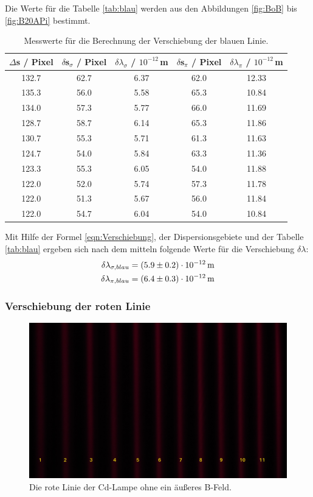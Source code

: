 Die Werte für die Tabelle \eqref{tab:blau} werden aus den Abbildungen \eqref{fig:BoB} bis \eqref{fig:B20APi} bestimmt.

\begin{table}[H]
  \centering
  \caption{Messwerte für die Berechnung der Verschiebung der blauen Linie.}
  \label{tab:blau}
  \begin{tabular}{c | c c | c c}
    $\Delta$s / Pixel & $\delta$s$_{\sigma}$ / Pixel & $\delta \lambda_{\sigma}$ / $10^{-12}$\,m & $\delta$s$_{\pi}$ / Pixel & $\delta \lambda_{\pi}$ / $10^{-12}$\,m \\
    \hline
    132.7 & 62.7 & 6.37 & 62.0 & 12.33 \\
    135.3 & 56.0 & 5.58 & 65.3 & 10.84 \\
    134.0 & 57.3 & 5.77 & 66.0 & 11.69 \\
    128.7 & 58.7 & 6.14 & 65.3 & 11.86 \\
    130.7 & 55.3 & 5.71 & 61.3 & 11.63 \\
    124.7 & 54.0 & 5.84 & 63.3 & 11.36 \\
    123.3 & 55.3 & 6.05 & 54.0 & 11.88 \\
    122.0 & 52.0 & 5.74 & 57.3 & 11.78 \\
    122.0 & 51.3 & 5.67 & 56.0 & 11.84 \\
    122.0 & 54.7 & 6.04 & 54.0 & 10.84 \\
    \hline
  \end{tabular}
\end{table}


Mit Hilfe der Formel \eqref{eqn:Verschiebung}, der Dispersionsgebiete und der Tabelle \eqref{tab:blau} ergeben sich nach dem mitteln folgende Werte für die Verschiebung $\delta\lambda$:
\begin{align*}
  \delta \lambda_{\sigma,blau} = (\num{5.9 +- 0.2})\cdot 10^{-12}\,\text{m} \\
  \delta \lambda_{\pi,blau} = (\num{6.4 +- 0.3})\cdot 10^{-12}\,\text{m}
\end{align*}



\subsubsection{Verschiebung der roten Linie}
\begin{figure}[H]
  \centering
  \includegraphics[width=0.8\linewidth]{Bilder/RoB.JPG}
  \caption{Die rote Linie der Cd-Lampe ohne ein äußeres B-Feld.}
  \label{fig:RoB}
\end{figure}

